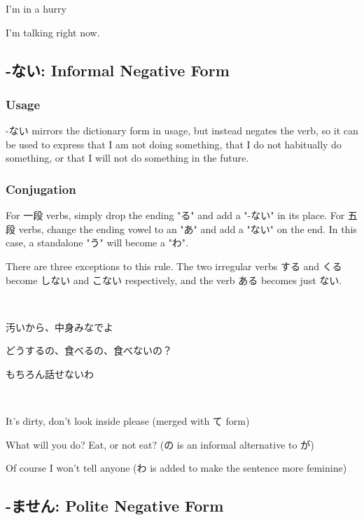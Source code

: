 \documentclass{article}
\begin{document}
\begin{CJK}{UTF8}{min}
\begin{solution}
I'm in a hurry

I'm talking right now. 
\end{solution}

\subsection{-ない: Informal Negative Form}

\subsubsection{Usage}

-ない mirrors the dictionary form in usage, but instead negates the verb, so it can be used to express that I am not doing something, that I do not habitually do something, or that I will not do something in the future.

\subsubsection{Conjugation}

For 一段 verbs, simply drop the ending "る" and add a "-ない" in its place. For 五段 verbs, change the ending vowel to an "あ" and add a "ない" on the end. In this case, a standalone "う" will become a "わ". 

There are three exceptions to this rule. The two irregular verbs する and くる become しない and こない respectively, and the verb ある becomes just ない.

\begin{example}
\ 

汚いから、中身みなでよ

どうするの、食べるの、食べないの？

もちろん話せないわ
\end{example}

\begin{solution}
\ 

It's dirty, don't look inside please (merged with て form)

What will you do? Eat, or not eat? (の is an informal alternative to が)

Of course I won't tell anyone (わ is added to make the sentence more feminine)
\end{solution}

\subsection{-ません: Polite Negative Form}


\end{CJK}
\end{document}
